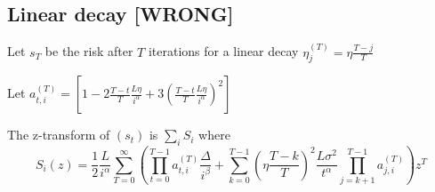 \subsection{Linear decay [WRONG]}

Let $s_T$ be the risk after $T$ iterations for a linear decay $\eta_{j}^{(T)} = \eta\frac{T-j}{T}$

Let $a_{t,i}^{(T)} = \left[ 1 - 2 \frac{T-t}{T} \frac{L\eta}{i^\alpha} + 3 \left( \frac{T-t}{T} \frac{L\eta}{i^\alpha} \right)^2 \right]$


The z-transform of $(s_t)$ is $\sum_i S_i$ where
\[
S_i(z) = \frac{1}{2} \frac{L}{i^\alpha}\sum_{T=0}^{\infty} \left( \prod_{t=0}^{T-1} a_{t,i}^{(T)} \frac{\Delta}{i^\beta} + \sum_{k=0}^{T-1} \left( \eta \frac{T-k}{T} \right)^2 \frac{L\sigma^2}{t^\alpha} \prod_{j=k+1}^{T-1} a_{j,i}^{(T)} \right) z^T
\]

















